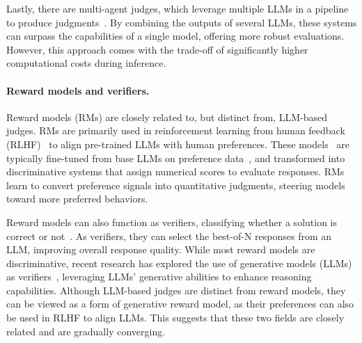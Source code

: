 \documentclass{article} %
\begin{document}
Lastly, there are multi-agent judges, which leverage multiple LLMs in a pipeline to produce judgments~\citep{chan2023chateval, verga2024poll, bai2022constitutional}. By combining the outputs of several LLMs, these systems can surpass the capabilities of a single model, offering more robust evaluations. However, this approach comes with the trade-off of significantly higher computational costs during inference.

\paragraph{Reward models and verifiers.}
Reward models (RMs) are closely related to, but distinct from, LLM-based judges. RMs are primarily used in reinforcement learning from human feedback (RLHF)~\citep{christiano2017rlhf, ziegler2019rlhf} to align pre-trained LLMs with human preferences. These models~\citep{starling2023, skyworkreward2024} are typically fine-tuned from base LLMs on preference data~\citep{wang2024helpsteer2, park2024offsetbias, wildguard2024}, and transformed into discriminative systems that assign numerical scores to evaluate responses. RMs learn to convert preference signals into quantitative judgments, steering models toward more preferred behaviors. 

Reward models can also function as verifiers, classifying whether a solution is correct or not~\citep{cobbe2021verify, lightman2023verify, wang2023mathverify, luo2024improve, saunders2022self, uesato2022solving, yu2024ovm}. As verifiers, they can select the best-of-N responses from an LLM, improving overall response quality. While most reward models are discriminative, recent research has explored the use of generative models (LLMs) as verifiers~\citep{zhang2024genverifier}, leveraging LLMs' generative abilities to enhance reasoning capabilities. Although LLM-based judges are distinct from reward models, they can be viewed as a form of generative reward model, as their preferences can also be used in RLHF to align LLMs. This suggests that these two fields are closely related and are gradually converging.
\end{document}
